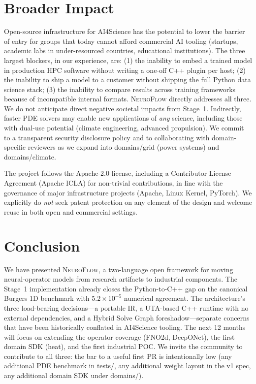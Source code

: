 \documentclass[10pt,twocolumn]{article}
\renewcommand{\texttt}[1]{{\normalfont\ttfamily #1}\normalfont\rmfamily}
\newcommand{\nf}{\textsc{NeuroFlow}}
\begin{document}
\section{Broader Impact}

Open-source infrastructure for AI4Science has the potential to
lower the barrier of entry for groups that today cannot afford
commercial AI tooling (startups, academic labs in
under-resourced countries, educational institutions).  The
three largest blockers, in our experience, are: (1) the
inability to embed a trained model in production HPC software
without writing a one-off C{++} plugin per host; (2) the
inability to ship a model to a customer without shipping the
full Python data science stack; (3) the inability to compare
results across training frameworks because of incompatible
internal formats.  \nf{} directly addresses all three.
%
We do not anticipate direct negative societal impacts from
Stage~1.  Indirectly, faster PDE solvers may enable new
applications of \emph{any} science, including those with
dual-use potential (climate engineering, advanced propulsion).
We commit to a transparent security disclosure policy and to
collaborating with domain-specific reviewers as we expand
into \texttt{domains/grid} (power systems) and
\texttt{domains/climate}.

The project follows the Apache-2.0 license, including a
Contributor License Agreement (Apache ICLA) for non-trivial
contributions, in line with the governance of major
infrastructure projects (Apache, Linux Kernel, PyTorch).  We
explicitly do \emph{not} seek patent protection on any element
of the design and welcome reuse in both open and commercial
settings.

\section{Conclusion}

We have presented \nf{}, a two-language open framework for
moving neural-operator models from research artifacts to
industrial components.  The Stage~1 implementation already
closes the Python-to-C{++} gap on the canonical Burgers 1D
benchmark with $5.2 \times 10^{-5}$ numerical agreement.
The architecture's three load-bearing decisions---a portable
IR, a UTA-based C{++} runtime with no external dependencies,
and a Hybrid Solve Graph foreshadow---separate concerns that
have been historically conflated in AI4Science tooling.
%
The next 12 months will focus on extending the operator
coverage (FNO2d, DeepONet), the first domain SDK
(\texttt{heat}), and the first industrial POC.  We invite the
community to contribute to all three: the bar to a useful
first PR is intentionally low (any additional PDE benchmark
in \texttt{tests/}, any additional weight layout in the v1
spec, any additional domain SDK under \texttt{domains/}).
%
\end{document}
